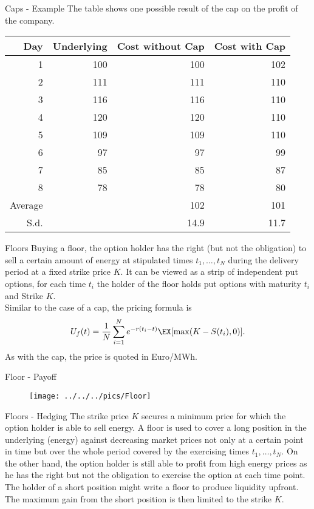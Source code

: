 Caps - Example
The table shows one possible result of the cap on the profit of the company.
\begin{tabular}{rrrr}
       Day & Underlying & Cost without Cap & Cost with Cap \\
\hline
         1 &        100 &        100 &        102 \\
         2 &        111 &        111 &        110 \\
         3 &        116 &        116 &        110 \\
         4 &        120 &        120 &        110 \\
         5 &        109 &        109 &        110 \\
         6 &         97 &         97 &         99 \\
         7 &         85 &         85 &         87 \\
         8 &         78 &         78 &         80 \\
\hline
   Average &            &        102 &        101 \\
   S.d.&&14.9&11.7
\end{tabular}


Floors
Buying a floor, the option holder has the right (but not the
obligation) to sell a certain amount of energy at stipulated times
$t_1,\ldots,t_N$ during the delivery period at a fixed strike
price $K$. It can be viewed as a strip of
independent put options, for each time $t_i$ the holder of the floor holds put options with maturity $t_i$ and Strike $K$. \\
Similar to the case of a cap, the pricing formula is
$$U_f(t)=\frac{1}{N}\sum_{i=1}^Ne^{-r(t_i-t)}\EX[\max(K-S(t_i),0)].$$
As with the cap, the price is quoted in Euro/MWh.


Floor - Payoff
\begin{figure}
	\centering
		\texttt{[image: ../../../pics/Floor]}
	\label{fig:Floor}
\end{figure}


Floors - Hedging
The strike price $K$ secures a minimum price for which the option holder is able to sell energy. A floor is used to cover a long position in the underlying (energy) against decreasing market prices not only at a certain point in time but over the whole period covered by the exercising times $t_1,\ldots,t_N$.
On the other hand, the option holder is still able to profit from high energy prices as he has the right but not the obligation to exercise the option at each time point. \\
The holder of a short position might write a floor to produce liquidity upfront. The maximum gain from the short position is then limited to the strike $K$.


